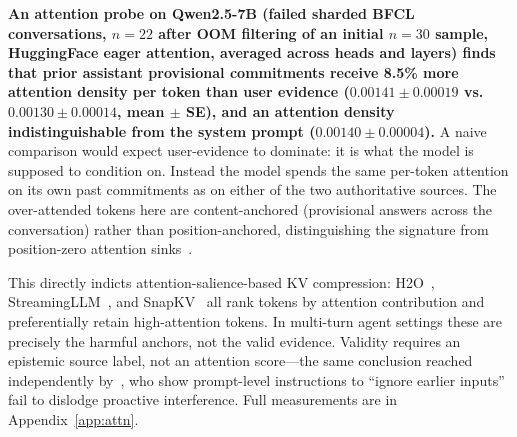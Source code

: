 \documentclass{article}
\begin{document}
\textbf{An attention probe on Qwen2.5-7B (failed sharded BFCL conversations, $n=22$ after OOM filtering of an initial $n=30$ sample, HuggingFace eager attention, averaged across heads and layers) finds that prior assistant provisional commitments receive 8.5\% more attention density per token than user evidence ($0.00141 \pm 0.00019$ vs.\ $0.00130 \pm 0.00014$, mean $\pm$ SE), and an attention density indistinguishable from the system prompt ($0.00140 \pm 0.00004$).} A naive comparison would expect user-evidence to dominate: it is what the model is supposed to condition on. Instead the model spends the same per-token attention on its own past commitments as on either of the two authoritative sources. The over-attended tokens here are content-anchored (provisional answers across the conversation) rather than position-anchored, distinguishing the signature from position-zero attention sinks~\citep{xiao2024streamingllm,sun2025attentionsink}.

This directly indicts attention-salience-based KV compression: H2O~\citep{zhang2023h2o}, StreamingLLM~\citep{xiao2024streamingllm}, and SnapKV~\citep{li2024snapkv} all rank tokens by attention contribution and preferentially retain high-attention tokens. In multi-turn agent settings these are precisely the harmful anchors, not the valid evidence. Validity requires an epistemic source label, not an attention score---the same conclusion reached independently by~\citet{wang2025proactive}, who show prompt-level instructions to ``ignore earlier inputs'' fail to dislodge proactive interference. Full measurements are in Appendix~\ref{app:attn}.
\end{document}
